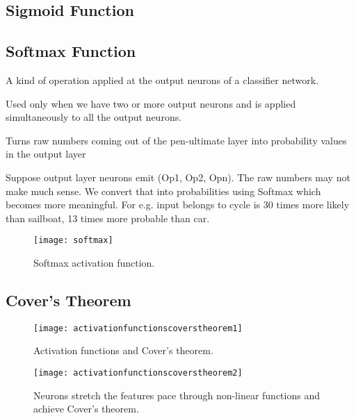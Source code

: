 	\subsection{Sigmoid Function}

	\subsection{Softmax Function}
	\begin{bulletedlist}
		\item A kind of operation applied at the output neurons of a classifier network.
		\item Used only when we have two or more output neurons and is applied simultaneously to all the output neurons.
		\item Turns raw numbers coming out of the pen-ultimate layer into probability values in the output layer
		\item Suppose output layer neurons emit (Op1, Op2, Opn). The raw numbers may not make much sense. We convert that into probabilities using Softmax which becomes more meaningful. For e.g. input belongs to cycle is 30 times more likely than sailboat, 13 times more probable than car.
	\end{bulletedlist}

 	\begin{figure}[htb]
		\centering
		\texttt{[image: softmax]}
		\caption[Softmax activation function]{Softmax activation function.}
		\label{fig:softmax}
	\end{figure}


	\subsection{Cover's Theorem}

 	\begin{figure}[htb]
		\centering
		\texttt{[image: activationfunctionscoverstheorem1]}
		\caption[Activation functions and Cover's theorem]{Activation functions and Cover's theorem.}
		\label{fig:activationfunctionscoverstheorem1}
	\end{figure}
 	\begin{figure}[htb]
		\centering
		\texttt{[image: activationfunctionscoverstheorem2]}
		\caption[Neurons stretch features to achieve Cover's theorem]{Neurons stretch the features pace through non-linear functions and achieve Cover's theorem.}
		\label{fig:activationfunctionscoverstheorem2}
	\end{figure}

